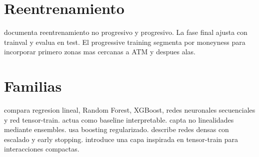 \section{Reentrenamiento}

 documenta reentrenamiento no progresivo y progresivo. La fase final ajusta con trainval y evalua en test. El progressive training segmenta por moneyness para incorporar primero zonas mas cercanas a ATM y despues alas.

\section{Familias}

 compara regresion lineal, Random Forest, XGBoost, redes neuronales secuenciales y red tensor-train.  actua como baseline interpretable.  capta no linealidades mediante ensembles.  usa boosting regularizado.  describe redes densas con escalado y early stopping.  introduce una capa inspirada en tensor-train para interacciones compactas.
